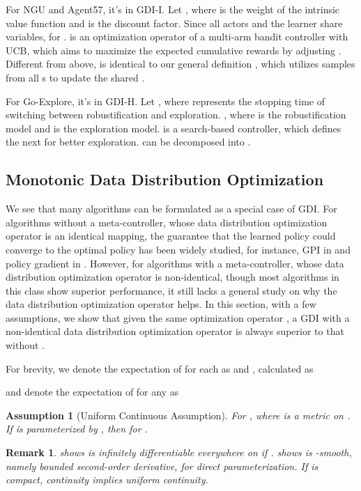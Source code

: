 \documentclass[nohyperref]{article}
\theoremstyle{plain}
\newtheorem*{Remark}{\textbf{Remark}}
\newtheorem{Assumption}{\textbf{Assumption}}
\begin{document}
For NGU and Agent57, it's in GDI-I. 
Let , where  is the weight of the intrinsic value function and  is the discount factor.
Since all actors and the learner share variables,  for .
 is an optimization operator of a multi-arm bandit controller with UCB, which aims to maximize the expected cumulative rewards by adjusting .
Different from above,  is identical to our general definition ,
which utilizes samples from all s to update the shared .


For Go-Explore, it's in GDI-H. 
Let , where  represents the stopping time of switching between robustification and exploration.
, where  is the robustification model and  is the exploration model.
 is a search-based controller, which defines the next  for better exploration.
 can be decomposed into .

\subsection{Monotonic Data Distribution Optimization}
\label{sec: Monotonic Data Distribution Optimization}

We see that many algorithms can be formulated as a special case of GDI.
For algorithms without a meta-controller, whose data distribution optimization operator  is an identical mapping, the guarantee that the learned policy could converge to the optimal policy has been widely studied, for instance, GPI in \citep{sutton} and policy gradient in \citep{pgtheory}.
However, for algorithms with a meta-controller, whose data distribution optimization operator  is non-identical, though most algorithms in this class show superior performance, it still lacks a general study on why the data distribution optimization operator  helps.
In this section, with a few assumptions, we show that given the same optimization operator , a GDI with a non-identical data distribution optimization operator  is always superior to that without .

For brevity, we denote the expectation of  for each  as  and , calculated as

and denote the expectation of  for any  as 
    

\begin{Assumption}[Uniform Continuous Assumption]
    For ,
    where  is a metric on .
    If  is parameterized by , then for .
\label{asp:1}
\end{Assumption}
\begin{Remark}
    \citep{polytope} shows  is infinitely differentiable everywhere on  if .
    \citep{pgtheory} shows  is -smooth, namely bounded second-order derivative, for direct parameterization.
    If  is compact, continuity implies uniform continuity.
\end{Remark}
\end{document}
